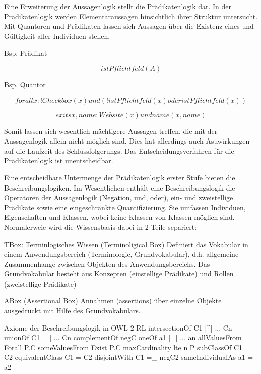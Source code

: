 \documentclass[runningheads,a4paper]{llncs}
\begin{document}
Eine Erweiterung der Aussagenlogik stellt die Prädikatenlogik dar.
In der Prädikatenlogik werden Elementaraussagen hinsichtlich ihrer Struktur untersucht.
Mit Quantoren  und Prädikaten lassen sich Aussagen über die Existenz eines und Gültigkeit aller Individuen stellen.

Bsp. Prädikat

\begin{equation}
istPflichtfeld(A)
\end{equation}

Bsp. Quantor

\begin{equation}
forall x: !Checkbox(x) und (!istPflichtfeld(x) oder istPflichtfeld(x))
\end{equation}

\begin{equation}

exits x,name: Website(x) und name(x, name)
\end{equation}

Somit lassen sich wesentlich mächtigere Aussagen treffen, die mit der Aussagenlogik allein nicht möglich sind.
Dies hat allerdings auch Asuwirkungen auf die Laufzeit des Schlussfolgerungs.
Das Entscheidungsverfahren für die Prädikatenlogik ist unentscheidbar.

Eine entscheidbare Untermenge der Prädikatenlogik erster Stufe bieten die Beschreibungslogiken.
Im Wesentlichen enthält eine Beschreibungslogik die Operatoren der Aussagenlogik (Negation, und, oder), ein- und zweistellige Prädikate sowie eine eingeschränkte Quantifizierung.
Sie umfassen Individuen, Eigenschaften und Klassen, wobei keine Klassen von Klassen möglich sind.
Normalerweie wird die Wissensbasis dabei in 2 Teile separiert:

TBox: Terminlogisches Wissen (Terminoligical Box)
Definiert das Vokabular in einem Anwendungsbereich (Terminologie, Grundvokabular), d.h. allgemeine Zusammenhange zwischen Objekten des Anwendungsbereichs.
Das Grundvokabular besteht aus Konzepten (einstellige Prädikate) und Rollen (zweistellige Prädikate)

ABox (Assertional Box)
Annahmen (assertions) über einzelne Objekte ausgedrückt mit
Hilfe des Grundvokabulars.

Axiome der Beschreibungslogik in OWL 2 RL
intersectionOf C1 |^| ... Cn
unionOf C1 |_| ... Cn
complementOf negC
oneOf {a1} |_| ... {an}
allValuesFrom Forall P.C
someValuesFrom Exist P.C
maxCardinality lte n P
subClassOf C1 =_ C2
equivalentClass C1 = C2
disjointWith C1 =_ negC2
sameIndividualAs {a1} = {a2}
\end{document}
